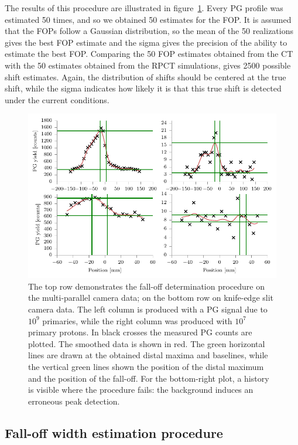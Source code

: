 \documentclass[a4paper,english,12pt]{article}
\begin{document}
The results of this procedure are illustrated in figure~\ref{fig:our-fit}. Every PG profile was estimated 50 times, and so we obtained 50 estimates for the FOP. It is assumed that the FOPs follow a Gaussian distribution, so the mean of the 50 realizations gives the best FOP estimate and the sigma gives the precision of the ability to estimate the best FOP. Comparing the 50 FOP estimates obtained from the CT with the 50 estimates obtained from the RPCT simulations, gives 2500 possible shift estimates. Again, the distribution of shifts should be centered at the true shift, while the sigma indicates how likely it is that this true shift is detected under the current conditions.

\begin{figure}[htp]
  \centering
  \includegraphics[width=0.9\linewidth]{fopproc}
  \caption{The top row demonstrates the fall-off determination procedure on the multi-parallel camera data; on the bottom row on knife-edge slit camera data. The left column is produced with a PG signal due to $10^9$ primaries, while the right column was produced with $10^7$ primary protons. In black crosses the measured PG counts are plotted. The smoothed data is shown in red. The green horizontal lines are drawn at the obtained distal maxima and baselines, while the vertical green lines shown the position of the distal maximum and the position of the fall-off. For the bottom-right plot, a history is visible where the procedure fails: the background induces an erroneous peak detection.}
  \label{fig:our-fit}
\end{figure}

\subsection{Fall-off width estimation procedure}
\end{document}
